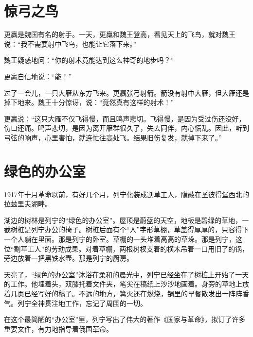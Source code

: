 \documentclass[12pt,UTF-8,openany]{ctexbook}
\begin{document}
\chapter{惊弓之鸟}

\begin{large}
    
    更羸是魏国有名的射手。一天，更羸和魏王登高，看见天上的飞鸟，就对魏王说：“我不需要射中飞鸟，也能让它落下来。”
    
    魏王疑惑地问：“你的射术竟能达到这么神奇的地步吗？”
    
    更羸自信地说：“能！”
    
    过了一会儿，一只大雁从东方飞来。更羸张弓射箭。箭没有射中大雁，但大雁还是掉下地来。魏王十分惊讶，说：“竟然真有这样的射术！”
    
    更羸说：“这只大雁不仅飞得慢，而且鸣声悲切。飞得慢，是因为受过伤还没好，伤口还痛。鸣声悲切，是因为离开雁群很久了，失去同伴，内心慌乱。因此，听到弓弦的响声，心里害怕，就连忙往高处飞。结果旧伤复发，就掉下来了。”
    
\end{large}



\chapter{绿色的办公室}

\begin{large}
    
    1917年十月革命以前，有好几个月，列宁化装成割草工人，隐蔽在圣彼得堡西北的拉兹里夫湖畔。
    
    湖边的树林是列宁的“绿色的办公室”。屋顶是蔚蓝的天空，地板是碧绿的草地，一截树桩是列宁办公的椅子。树桩后面有个“人”字形草棚，草盖得厚厚的，只容得下一个人躺在里面。那是列宁的卧室。草棚的一头堆着高高的草垛。那是列宁，这位“割草工人”的劳动成果。对着草棚，两根树杈支着的横木吊着一口用旧了的锅，旁边放着一把黑铁水壶。那是列宁的厨房。
    
    天亮了，“绿色的办公室”沐浴在柔和的晨光中，列宁已经坐在了树桩上开始了一天的工作。他埋着头，双膝托着文件夹，笔尖在稿纸上沙沙地画着。身旁的草地上放着几页已经写好的稿子。不远的地方，篝火还在燃烧，锅里的早餐散发出一阵阵香气。列宁全神贯注地工作，忘记了周围的一切。
    
    在这个最简陋的“办公室”里，列宁写出了伟大的著作《国家与革命》，拟订了许多重要文件，有力地指导着俄国革命。
    
\end{large}
\end{document}
